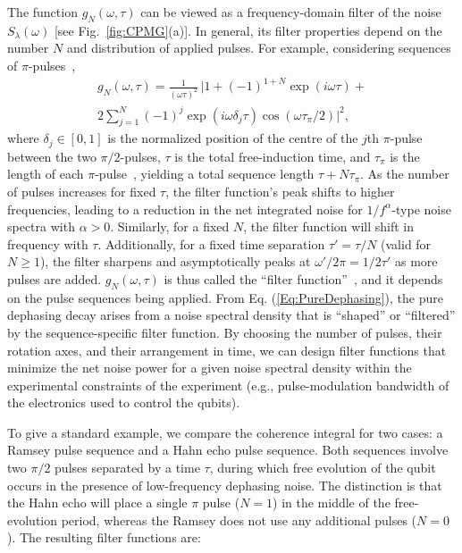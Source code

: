 \documentclass[aip,apr,twocolumn,showpacs,superscriptaddress,groupedaddress,nofootinbib,reprint]{revtex4-1}  %
\begin{document}
The function $g_N(\omega,\tau)$ can be viewed as a frequency-domain filter of the noise $S_{\lambda}(\omega)$ [see Fig.~\ref{fig:CPMG}(a)].
In general, its filter properties depend on the number $N$ and distribution of applied pulses. For example, considering sequences of $\pi$-pulses~\cite{Martinis2003,Uhrig2007,Cywinski2008,Biercuk2009a,Biercuk2009b,Bylander2011},
%
\begin{multline} \label{eq:filter_def}
  g_N(\omega,\tau) =
  \frac{1}{(\omega\tau)^2} \, \Big| 1+(-1)^{1+N}\exp(i\omega\tau) + \\
  2\sum_{j=1}^{N} (-1)^j \exp(i\omega\delta_j\tau) \cos(\omega\tau_\pi/2) \Big|^2 ,
\end{multline}
%
where $\delta_j \in [0,1]$ is the normalized position of the centre of the $j$th $\pi$-pulse between the two $\pi/2$-pulses, $\tau$ is the total free-induction time, and $\tau_\pi$ is the length of each $\pi$-pulse~\cite{Biercuk2009a,Biercuk2009b}, yielding a total sequence length $\tau + N\tau_\pi$.
%
As the number of pulses increases for fixed $\tau$, the filter function's peak shifts to higher frequencies, leading to a reduction in the net integrated noise for $1/f^{\alpha}$-type noise spectra with $\alpha > 0$.
%
Similarly, for a fixed $N$, the filter function will shift in frequency with $\tau$.
%
Additionally, for a fixed time separation $\tau' = \tau/N$ (valid for $N \ge 1$), the filter sharpens and asymptotically peaks at $\omega'/2\pi = 1/2\tau'$ as more pulses are added. $g_N(\omega,\tau)$ is thus called the ``filter function''~\cite{Cywinski2008,Bylander2011}, and it depends on the pulse sequences being applied.
From Eq. (\ref{Eq:PureDephasing}), the pure dephasing decay arises from a noise spectral density that is ``shaped'' or ``filtered'' by the sequence-specific filter function. By choosing the number of pulses, their rotation axes, and their arrangement in time, we can design filter functions that minimize the net noise power for a given noise spectral density within the experimental constraints of the experiment (e.g., pulse-modulation bandwidth of the electronics used to control the qubits).

To give a standard example, we compare the coherence integral for two cases: a Ramsey pulse sequence and a Hahn echo pulse sequence. Both sequences involve two $\pi/2$ pulses separated by a time $\tau$, during which free evolution of the qubit occurs in the presence of low-frequency dephasing noise. The distinction is that the Hahn echo will place a single $\pi$ pulse ($N=1$) in the middle of the free-evolution period, whereas the Ramsey does not use any additional pulses ($N=0$). The resulting filter functions are:
\end{document}
